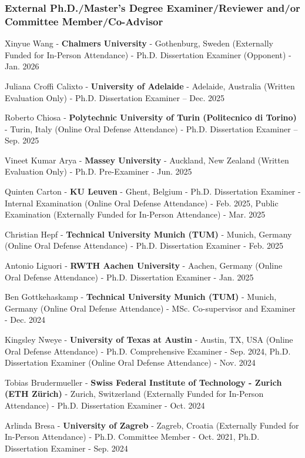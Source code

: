 \documentclass[10pt,a4paper]{article}
\begin{document}
\begin{small}
\subsubsection*{External Ph.D./Master's Degree Examiner/Reviewer and/or Committee Member/Co-Advisor}
\begin{etaremune}
\item
Xinyue Wang - \textbf{Chalmers University} - Gothenburg, Sweden (Externally Funded for In-Person Attendance) - Ph.D. Dissertation Examiner (Opponent) - Jan. 2026 
\item
Juliana Croffi Calixto - \textbf{University of Adelaide} - Adelaide, Australia (Written Evaluation Only) - Ph.D. Dissertation Examiner – Dec. 2025
\item
Roberto Chiosa - \textbf{Polytechnic University of Turin (Politecnico di Torino)} - Turin, Italy (Online Oral Defense Attendance) - Ph.D. Dissertation Examiner – Sep. 2025
\item
Vineet Kumar Arya - \textbf{Massey University} - Auckland, New Zealand (Written Evaluation Only) - Ph.D. Pre-Examiner - Jun. 2025
\item
Quinten Carton - \textbf{KU Leuven} - Ghent, Belgium  - Ph.D. Dissertation Examiner - Internal Examination (Online Oral Defense Attendance) - Feb. 2025, Public Examination (Externally Funded for In-Person Attendance) - Mar. 2025 
\item
Christian Hepf - \textbf{Technical University Munich (TUM)} - Munich, Germany (Online Oral Defense Attendance) - Ph.D. Dissertation Examiner - Feb. 2025
\item
Antonio Liguori - \textbf{RWTH Aachen University} - Aachen, Germany (Online Oral Defense Attendance) - Ph.D. Dissertation Examiner - Jan. 2025
\item
Ben Gottkehaskamp - \textbf{Technical University Munich (TUM)} - Munich, Germany (Online Oral Defense Attendance) - MSc. Co-supervisor and Examiner - Dec. 2024
\item
Kingsley Nweye - \textbf{University of Texas at Austin} - Austin, TX, USA (Online Oral Defense Attendance) - Ph.D. Comprehensive Examiner - Sep. 2024, Ph.D. Dissertation Examiner (Online Oral Defense Attendance) - Nov. 2024
\item
Tobias Brudermueller - \textbf{Swiss Federal Institute of Technology - Zurich (ETH Z\"urich)} - Zurich, Switzerland (Externally Funded for In-Person Attendance) - Ph.D. Dissertation Examiner - Oct. 2024 
\item
Arlinda Bresa - \textbf{University of Zagreb} - Zagreb, Croatia (Externally Funded for In-Person Attendance) - Ph.D. Committee Member - Oct. 2021, Ph.D. Dissertation Examiner - Sep. 2024

\end{etaremune}
\end{small}
\end{document}
